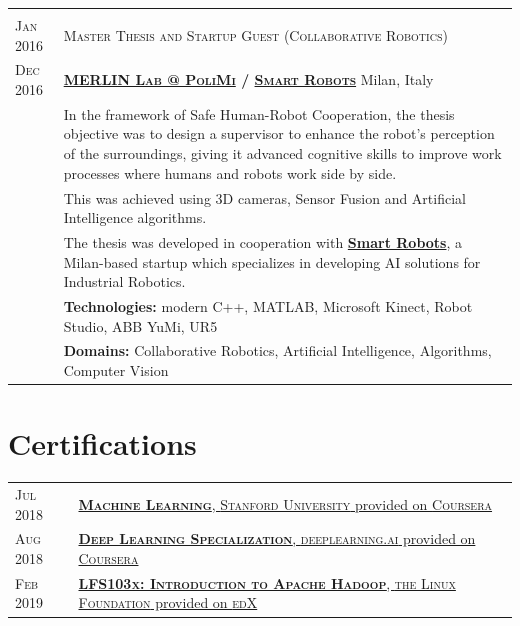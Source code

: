 \documentclass[a4paper,10pt]{article}
\begin{document}
\begin{tabular}{p{1.7cm}|p{15.5cm}}
		\multicolumn{2}{c}{} \\
		\centering\textsc{Jan 2016 } & 
		\textsc{Master Thesis and Startup Guest (Collaborative Robotics)} \\
		\centering\textsc{Dec 2016} &
		\textsc{\textbf{\href{http://merlin.dei.polimi.it/}{MERLIN Lab @ PoliMi} / \href{http://smartrobots.it/en/}{Smart Robots}}} \hfill Milan, Italy\\
		& In the framework of Safe Human-Robot Cooperation, the thesis objective was to design a supervisor to enhance the robot's perception of the surroundings, giving it advanced cognitive skills to improve work processes where humans and robots work side by side.\\
		& This was achieved using 3D cameras, Sensor Fusion and Artificial Intelligence algorithms.\\
		& The thesis was developed in cooperation with \textbf{\href{http://smartrobots.it/en/}{Smart Robots}}, a Milan-based startup which specializes in developing AI solutions for Industrial Robotics.\\
		& \textbf{Technologies:}  modern C++, MATLAB, Microsoft Kinect, Robot Studio, ABB YuMi, UR5\\
		& \textbf{Domains:} Collaborative Robotics, Artificial Intelligence, Algorithms, Computer Vision\\
	\end{tabular}

	\section{Certifications}
	\begin{tabular}{p{1.7cm}|p{15.5cm}}
		\centering\textsc{Jul 2018} &
		\href{https://www.coursera.org/account/accomplishments/certificate/PHU5XX9EQ5LP}{\textbf{\textsc{Machine Learning}}, \textsc{Stanford University} provided on \textsc{Coursera}} \\
		
		\centering\textsc{Aug 2018} &
		\href{https://www.coursera.org/account/accomplishments/specialization/certificate/MQRAWL6XD2QW}{\textbf{\textsc{Deep Learning Specialization}}, \textsc{deeplearning.ai} provided on \textsc{Coursera}} \\
		
		\centering\textsc{Feb 2019} &
		\href{https://courses.edx.org/certificates/62fb5163c20048faa605408b3f931718}{\textbf{\textsc{LFS103x: Introduction to Apache Hadoop}}, \textsc{the Linux Foundation} provided on \textsc{edX}} \\
		
	\end{tabular}
\end{document}
